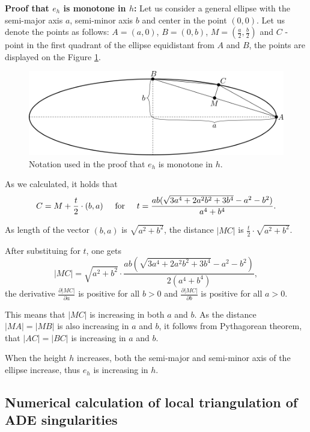 \textbf{Proof that $e_h$ is monotone in $h$:} Let us consider a general ellipse
with the semi-major axis $a$, semi-minor axis $b$ and center in the point $(0, 0)$. 
Let us denote the points as follows: $A=(a, 0)$, $B=(0, b)$, $M=(\frac{a}{2}, \frac{b}{2})$ 
and $C$ - point in the first quadrant of the ellipse equidistant from $A$ and $B$, the points
are displayed on the Figure \ref{img:40}.

\begin{figure}
    \centerline{\includegraphics[scale=0.5]{images/img40}}
    \caption[Notation used in the proof]
    {Notation used in the proof that $e_h$ is monotone in $h$.}
    \label{img:40}
\end{figure}

As we calculated, it holds that
$$C = M + \frac{t}{2} \cdot (b, a) \hspace{5mm} \textrm{for} \hspace{5mm} t=\frac{ab(\sqrt{3a^4+2a^2b^2+3b^4}-a^2-b^2)}{a^4+b^4}.$$

As length of the vector $(b,a)$ is $\sqrt{a^2+b^2}$, the distance 
$|MC|$ is $\frac{t}{2} \cdot \sqrt{a^2+b^2}$.

After substituing for $t$, one gets 
$$|MC|=\sqrt{a^2+b^2}\cdot\frac{ab(\sqrt{3a^4+2a^2b^2+3b^4}-a^2-b^2)}{2(a^4+b^4)},$$
the derivative $\frac{\partial|MC|}{\partial a}$ is positive for all $b>0$ and
$\frac{\partial|MC|}{\partial b}$ is positive for all $a>0$.

This means that $|MC|$ is increasing in both $a$ and $b$. As the distance $|MA|=|MB|$ is 
also increasing in $a$ and $b$, it follows from Pythagorean theorem, that $|AC|=|BC|$
is increasing in $a$ and $b$.

When the height $h$ increases, both the semi-major and semi-minor axis of the ellipse increase,
thus $e_h$ is increasing in $h$.

\subsection{Numerical calculation of local triangulation of ADE singularities}

